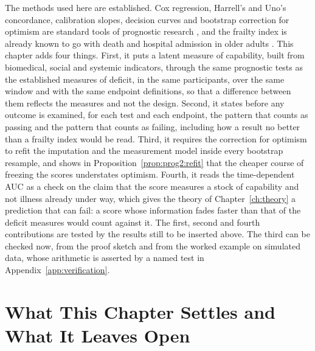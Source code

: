 \noindent The methods used here are established. Cox regression, Harrell's and Uno's concordance, calibration slopes, decision curves and bootstrap correction for optimism are standard tools of prognostic research \citep{steyerberg_2019,vancalster_2019,collins_2015}, and the frailty index is already known to go with death and hospital admission in older adults \citep{rockwood_mitnitski_2007,searle_2008}. This chapter adds four things. First, it puts a latent measure of capability, built from biomedical, social and systemic indicators, through the same prognostic tests as the established measures of deficit, in the same participants, over the same window and with the same endpoint definitions, so that a difference between them reflects the measures and not the design. Second, it states before any outcome is examined, for each test and each endpoint, the pattern that counts as passing and the pattern that counts as failing, including how a result no better than a frailty index would be read. Third, it requires the correction for optimism to refit the imputation and the measurement model inside every bootstrap resample, and shows in Proposition~\ref{prop:prog2:refit} that the cheaper course of freezing the scores understates optimism. Fourth, it reads the time-dependent AUC as a check on the claim that the score measures a stock of capability and not illness already under way, which gives the theory of Chapter~\ref{ch:theory} a prediction that can fail: a score whose information fades faster than that of the deficit measures would count against it. The first, second and fourth contributions are tested by the results still to be inserted above. The third can be checked now, from the proof sketch and from the worked example on simulated data, whose arithmetic is asserted by a named test in Appendix~\ref{app:verification}.

\section{What This Chapter Settles and What It Leaves Open}
\label{sec:prog-close}

